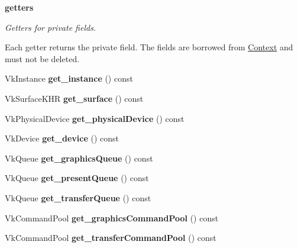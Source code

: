 \begin{Indent}\textbf{ getters}\par
{\em Getters for private fields.

Each getter returns the private field. The fields are borrowed from \hyperlink{classblaze_1_1Context}{Context} and must not be deleted. }\begin{DoxyCompactItemize}
\item 
\mbox{\label{classblaze_1_1Context_afc95e93baed50f6d853d9830a9c8dda9}} 
Vk\+Instance {\bfseries get\+\_\+instance} () const
\item 
\mbox{\label{classblaze_1_1Context_a94ea11c7e5817195a1e3b24df660c7ac}} 
Vk\+Surface\+K\+HR {\bfseries get\+\_\+surface} () const
\item 
\mbox{\label{classblaze_1_1Context_ab510d36135bc340f0380ed7384b0bdbb}} 
Vk\+Physical\+Device {\bfseries get\+\_\+physical\+Device} () const
\item 
\mbox{\label{classblaze_1_1Context_a6104e1eb49e7d8a47304fecb0a652517}} 
Vk\+Device {\bfseries get\+\_\+device} () const
\item 
\mbox{\label{classblaze_1_1Context_aaf5bdd5d8a8ae9c63be4224251784f4f}} 
Vk\+Queue {\bfseries get\+\_\+graphics\+Queue} () const
\item 
\mbox{\label{classblaze_1_1Context_ad1c6371070dcbe6693b1f3410dfd8c07}} 
Vk\+Queue {\bfseries get\+\_\+present\+Queue} () const
\item 
\mbox{\label{classblaze_1_1Context_a523dee83904ae214ad8621d0945a5aff}} 
Vk\+Queue {\bfseries get\+\_\+transfer\+Queue} () const
\item 
\mbox{\label{classblaze_1_1Context_ab8beaaf07efaefac02c036cf316f9f6c}} 
Vk\+Command\+Pool {\bfseries get\+\_\+graphics\+Command\+Pool} () const
\item 
\mbox{\label{classblaze_1_1Context_a44bcd6149ae21cb814daedc46ea384af}} 
Vk\+Command\+Pool {\bfseries get\+\_\+transfer\+Command\+Pool} () const

\end{DoxyCompactItemize}
\end{Indent}
